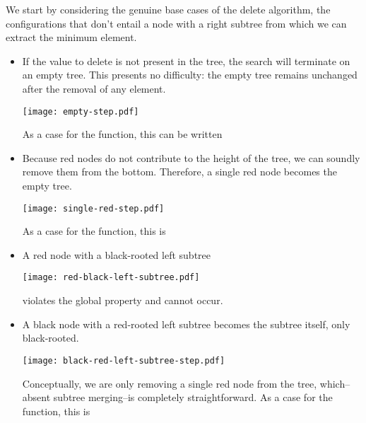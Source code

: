 \documentclass[preprint]{sigplanconf}
\begin{document}
We start by considering the genuine base cases of the delete algorithm, the
configurations that don't entail a node with a right subtree from which we can
extract the minimum element.

\begin{itemize}

\item If the value to delete is not present in the tree, the search will
terminate on an empty tree. This presents no difficulty: the empty tree remains
unchanged after the removal of any element.
\begin{center}
\texttt{[image: empty-step.pdf]}
\end{center}
As a case for the  function, this can be written
\begin{schemedisplay}
[(L) (L)]
\end{schemedisplay}

\item Because red nodes do not contribute to the height of the tree, we can
soundly remove them from the bottom. Therefore, a single red node becomes the
empty tree.
\begin{center}
\texttt{[image: single-red-step.pdf]}
\end{center}
As a case for the  function, this is
\begin{schemedisplay}
[(R (L) (== v) (L)) (L)]
\end{schemedisplay}

\item A red node with a black-rooted left subtree
\begin{center}
\texttt{[image: red-black-left-subtree.pdf]}
\end{center}
violates the global property and cannot occur.

\item A black node with a red-rooted left subtree becomes the subtree itself,
only black-rooted.
\begin{center}
\texttt{[image: black-red-left-subtree-step.pdf]}
\end{center}
Conceptually, we are only removing a single red node from the tree,
which--absent subtree merging--is completely straightforward. As a case for the
 function, this is
\begin{schemedisplay}
[(B (R a x b) (== v) (L)) (B a x b)]
\end{schemedisplay}


\end{itemize}
\end{document}

